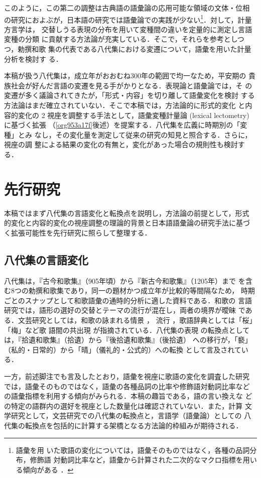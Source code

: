 \documentclass[submit]{ipsj}
\renewcommand{\ref}{\cref}
\begin{document}
このように，この第二の調整は古典語の語彙論の応用可能な領域の文体・位相
の研究におよぶが，日本語の研究では語彙論での実践が少ない\footnote{語彙を用
いた歌語の変化については，語彙そのものではなく，各種の品詞分布，修飾語
対動詞比率など，語彙から計算された二次的なマクロ指標を用いる傾向がある
\cite{nishihata1992Waka,hatano1941Waka}．}．対して，計量方言学は，
交替しうる表現の分布を用いて変種間の違いを定量的に測定し言語変種の分類
に貢献する方法論が充実している．そこで，それらを参考としつつ，勅撰和歌
集の代表である八代集における変遷について，語彙を用いた計量分析を検討す
る．

本稿が扱う八代集は，成立年がおおむね300年の範囲で均一なため，平安期の
貴族社会が好んだ言語の変遷を見る手がかりとなる．表現論と語彙論では，そ
の変遷が多く議論されてきたが，「形式・内容」を切り離して語彙変化を検討
する方法論はまだ確立されていない．そこで本稿では，方法論的に形式的変化
と内容的変化の 2 視座を調整する手法として，語彙変種計量論 (lexical
lectometry) \cite{Speelman2003Profilebased} に基づく拡張
（\ref{org953a17f}後述）を提案する．八代集を広義に時期別の「変種」とみ
なし，その変化量を測定して従来の研究の知見と照合する．さらに，視座の調
整による結果の変化の有無と，変化があった場合の規則性も検討する．
\section{先行研究\label{org5132413}}
\label{sec:org54c76fb}
本稿ではまず八代集の言語変化と転換点を説明し，方法論の前提として，形式
的変化と内容的変化の視座調整の理論的背景と日本語語彙論の研究手法に基づ
く拡張可能性を先行研究に照らして整理する．
\subsection{八代集の言語変化\label{org26d71cd}}
\label{sec:org3e7c8cb}
八代集は，『古今和歌集』（905年頃）から『新古今和歌集』（1205年）まで
を含む8つの勅撰和歌集であり，同一の題材かつ成立年が比較的等間隔なため，
時期ごとのスナップとして和歌語彙の通時的分析に適した資料である．和歌の
言語研究では，語形の選好の交替とテーマの流行が混在し，両者の境界が曖昧
である．文芸研究としては，和歌の詠まれる情景 \cite{ueno1976Koshui}，
流行 \cite{kawamura1991Sekkan}，歌語辞典としては「桜」「梅」など歌
語間の共出現 \cite{katagiri1983Uta} が指摘されている．八代集の表現
の転換点としては，『拾遺和歌集』（拾遺）から『後拾遺和歌集』（後拾遺）
への移行が，「褻」（私的・日常的）から「晴」（儀礼的・公式的）への転換
として言及されている\cite{ueno1976Koshui,kawamura1991Sekkan}．

一方，前述脚注でも言及したとおり，語彙を視座に歌語の変化を調査した研究
では，語彙そのものではなく，語彙の各種品詞の比率や修飾語対動詞比率など
の語彙指標を利用する傾向がみられる\cite{tsuji1998Uta,nishihata1992Waka,hatano1941Waka}．本稿の趣旨である，語の言い換えな
どの特定の語群内の選好を視座とした数量化は確認されていない．また，計算
文学研究として，文芸研究での八代集の転換点と，言語学（語彙論）としての
八代集の転換点を包括的に計算する架橋となる方法論的枠組みが期待される．
\end{document}
